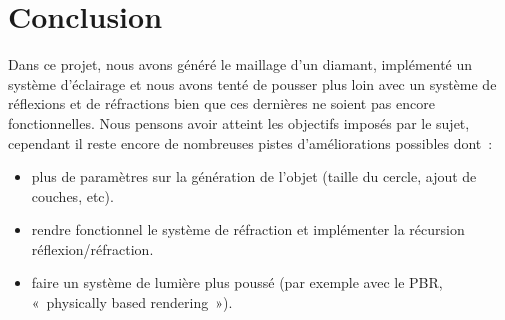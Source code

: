 \section{Conclusion}

Dans ce projet, nous avons généré le maillage d'un diamant, implémenté un système d'éclairage
et nous avons tenté de pousser plus loin avec un système de réflexions et de réfractions bien
que ces dernières ne soient pas encore fonctionnelles.
Nous pensons avoir atteint les objectifs imposés par le sujet, cependant il reste encore de nombreuses
pistes d'améliorations possibles dont~:
\begin{itemize}
    \item plus de paramètres sur la génération de l'objet (taille du cercle, ajout de couches, etc).
    \item rendre fonctionnel le système de réfraction et implémenter la récursion réflexion/réfraction.
    \item faire un système de lumière plus poussé (par exemple avec le PBR, «~physically based rendering~»).
\end{itemize}

